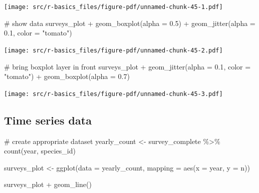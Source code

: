 \documentclass[
  letterpaper,
  DIV=11,
  numbers=noendperiod]{scrreprt}
\newenvironment{Shaded}{\begin{snugshade}}{\end{snugshade}}
\newcommand{\AttributeTok}[1]{\textcolor[rgb]{0.40,0.45,0.13}{#1}}
\newcommand{\CommentTok}[1]{\textcolor[rgb]{0.37,0.37,0.37}{#1}}
\newcommand{\FloatTok}[1]{\textcolor[rgb]{0.68,0.00,0.00}{#1}}
\newcommand{\FunctionTok}[1]{\textcolor[rgb]{0.28,0.35,0.67}{#1}}
\newcommand{\NormalTok}[1]{\textcolor[rgb]{0.00,0.23,0.31}{#1}}
\newcommand{\OtherTok}[1]{\textcolor[rgb]{0.00,0.23,0.31}{#1}}
\newcommand{\SpecialCharTok}[1]{\textcolor[rgb]{0.37,0.37,0.37}{#1}}
\newcommand{\StringTok}[1]{\textcolor[rgb]{0.13,0.47,0.30}{#1}}
\begin{document}
\texttt{[image: src/r-basics\_files/figure-pdf/unnamed-chunk-45-1.pdf]}

\begin{Shaded}
\begin{Highlighting}[]
\CommentTok{\# show data}
\NormalTok{surveys\_plot }\SpecialCharTok{+} \FunctionTok{geom\_boxplot}\NormalTok{(}\AttributeTok{alpha =} \FloatTok{0.5}\NormalTok{) }\SpecialCharTok{+} 
    \FunctionTok{geom\_jitter}\NormalTok{(}\AttributeTok{alpha =} \FloatTok{0.1}\NormalTok{, }\AttributeTok{color =} \StringTok{"tomato"}\NormalTok{)}
\end{Highlighting}
\end{Shaded}

\texttt{[image: src/r-basics\_files/figure-pdf/unnamed-chunk-45-2.pdf]}

\begin{Shaded}
\begin{Highlighting}[]
\CommentTok{\# bring boxplot layer in front}
\NormalTok{surveys\_plot }\SpecialCharTok{+} \FunctionTok{geom\_jitter}\NormalTok{(}\AttributeTok{alpha =} \FloatTok{0.1}\NormalTok{, }\AttributeTok{color =} \StringTok{"tomato"}\NormalTok{) }\SpecialCharTok{+}
    \FunctionTok{geom\_boxplot}\NormalTok{(}\AttributeTok{alpha =} \FloatTok{0.7}\NormalTok{)}
\end{Highlighting}
\end{Shaded}

\texttt{[image: src/r-basics\_files/figure-pdf/unnamed-chunk-45-3.pdf]}

\subsection{Time series data}\label{time-series-data}

\begin{Shaded}
\begin{Highlighting}[]
\CommentTok{\# create appropriate dataset}
\NormalTok{yearly\_count }\OtherTok{\textless{}{-}}\NormalTok{ survey\_complete }\SpecialCharTok{\%\textgreater{}\%}
    \FunctionTok{count}\NormalTok{(year, species\_id)}

\NormalTok{surveys\_plot }\OtherTok{\textless{}{-}} \FunctionTok{ggplot}\NormalTok{(}\AttributeTok{data =}\NormalTok{ yearly\_count, }
    \AttributeTok{mapping =} \FunctionTok{aes}\NormalTok{(}\AttributeTok{x =}\NormalTok{ year, }\AttributeTok{y =}\NormalTok{ n))}

\NormalTok{surveys\_plot }\SpecialCharTok{+} \FunctionTok{geom\_line}\NormalTok{()}
\end{Highlighting}
\end{Shaded}
\end{document}
